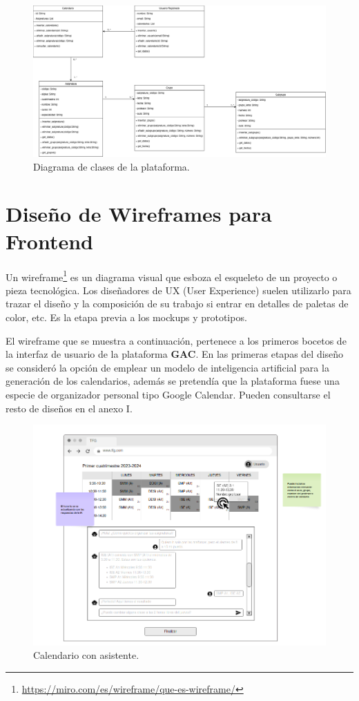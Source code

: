 \begin{figure}[H]
    \centering
    \includegraphics[width=1\textwidth]{./imagenes/Class_Diagram.png}
    \caption{Diagrama de clases de la plataforma.}
\end{figure}


\section{Diseño de Wireframes para Frontend}

Un wireframe\footnote{\url{https://miro.com/es/wireframe/que-es-wireframe/}} es un diagrama visual que esboza el esqueleto de un proyecto o pieza tecnológica. Los diseñadores de UX (User Experience) suelen utilizarlo para trazar el diseño y la composición de su trabajo si entrar en detalles de paletas de color, etc. Es la etapa previa a los mockups y prototipos.\newline

El wireframe que se muestra a continuación, pertenece a los primeros bocetos de la interfaz de usuario de la plataforma \textbf{GAC}. En las primeras etapas del diseño se consideró la opción de emplear un modelo de inteligencia artificial para la generación de los calendarios, además se pretendía que la plataforma fuese una especie de organizador personal tipo Google Calendar. Pueden consultarse el resto de diseños en el anexo I.\newline


\begin{figure}[H]
    \centering
    \includegraphics[width=1\textwidth]{./imagenes/Mockup_calendario.png}
    \caption{Calendario con asistente.}
\end{figure}

